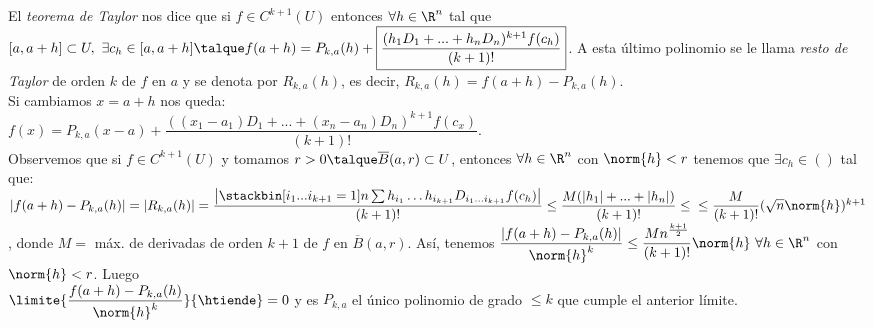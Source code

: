 	\begin{observacion} El \textit{teorema de Taylor} nos dice que si $f\in C^{k+1}(U)$ entonces $\forall h\in\R^n$ tal que $[a,a+h]\subset U,\ \exists c_h\in[a,a+h]\talque f(a+h)=P_{k,a}(h)+\boxed{\dfrac{(h_1D_1+...+h_nD_n)^{k+1}f(c_h)}{(k+1)!}}$. A esta último polinomio se le llama \textit{resto de Taylor} de orden $k$ de $f$ en $a$ y se denota por $R_{k,a}(h)$, es decir, $R_{k,a}(h)=f(a+h)-P_{k,a}(h)$.\\
	Si cambiamos $x=a+h$ nos queda:\\
	$f(x)=P_{k,a}(x-a)+\dfrac{((x_1-a_1)D_1+...+(x_n-a_n)D_n)^{k+1}f(c_x)}{(k+1)!}$.\\
	Observemos que si $f\in C^{k+1}(U)$ y tomamos $r>0\talque\overline{B}(a,r)\subset U$, entonces $\forall	h\in\R^n$ con $\norm{h}<r$ tenemos que $\exists c_h\in ()$ tal que:\\
	$|f(a+h)-P_{k,a}(h)|=|R_{k,a}(h)|=\dfrac{\left|\stackbin[i_1...i_{k+1}=1]{n}\sum h_{i_1}\hdots h_{i_{k+1}}D_{i_1\hdots i_{k+1}}f(c_h)\right|}{(k+1)!}\leq\dfrac{M(|h_1|+...+|h_n|)}{(k+1)!}\leq\\
	\leq\dfrac{M}{(k+1)!}(\sqrt{n}\norm{h})^{k+1}$, donde $M=$ máx. de derivadas de orden $k+1$ de $f$ en $\overline{B}(a,r)$. Así, tenemos $\dfrac{|f(a+h)-P_{k,a}(h)|}{\norm{h}^k}\leq\dfrac{Mn^{\frac{k+1}{2}}}{(k+1)!}\norm{h}\ \forall h\in\R^n$ con $\norm{h}<r$. Luego\\
	$\limite{\dfrac{f(a+h)-P_{k,a}(h)}{\norm{h}^k}}{\htiende}=0$ y es $P_{k,a}$ el único polinomio de grado $\leq k$ que cumple el anterior límite.
	\end{observacion}